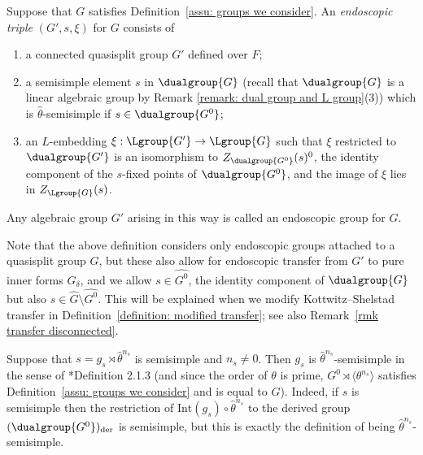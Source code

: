 \documentclass[11pt,letterpaper]{amsart}
\numberwithin{equation}{section}
\begin{document}
\begin{definition}\label{definition: endoscopic triple}
Suppose that $G$ satisfies Definition~\ref{assu: groups we consider}.
An {\it endoscopic triple} $(G',s,\xi)$ for $G$ consists of
\begin{enumerate}
    \item
    a connected quasisplit group $G'$ defined over $F$;
    \item 
    a semisimple element $s$ in $\dualgroup{G}$ (recall that $\dualgroup{G}$ is a linear algebraic group by Remark \ref{remark: dual group and L group}(3)) which is $\hat{\theta}$-semisimple if $s\in\dualgroup{G^0}$;
    \item 
    an $L$-embedding  $\xi:\Lgroup{G'}\rightarrow\Lgroup{G}$ such that $\xi$ restricted to $\dualgroup{G'}$ is an isomorphism to $Z_{\dualgroup{G^0}}({s})^0$, the identity component of the ${s}$-fixed points of $\dualgroup{G^0}$, and the image of $\xi$ lies in $Z_{\Lgroup{G}}(s)$.
\end{enumerate}
Any algebraic group $G'$ arising in this way is called an endoscopic group for $G$.
\end{definition}

\begin{remark}
    Note that the above definition considers only endoscopic groups attached to a quasisplit group $G$, but these also allow for endoscopic transfer from $G'$ to pure inner forms $G_\delta$, and 
        we allow $s \in \widehat{G^0}$, the identity component of $\dualgroup{G}$ but also $s\in \widehat{G}\setminus \widehat{G^0}$.
    This will be explained when we modify Kottwitz–Shelstad transfer in Definition~\ref{definition: modified transfer};
    see also Remark~\ref{rmk transfer disconnected}.
\end{remark}

\begin{remark}
    Suppose that $s=g_s\rtimes\hat{\theta}^{n_s}$ is semisimple and $n_s\neq 0$. Then $g_s$ is $\hat{\theta}^{n_s}$-semisimple in the sense of \cite{KS99}*{Definition 2.1.3} (and since the order of $\theta$ is prime,  $G^0\rtimes\langle\theta^{n_s}\rangle$ satisfies Definition~\ref{assu: groups we consider} and is equal to $G$). Indeed, if $s$ is semisimple then the restriction of $\mathrm{Int}(g_s)\circ\hat{\theta}^{n_s}$ to the derived group $(\dualgroup{G^0})_{\mathrm{der}}$ is semisimple, but this is exactly the definition of being $\hat{\theta}^{n_s}$-semisimple. 
\end{remark}
\end{document}
